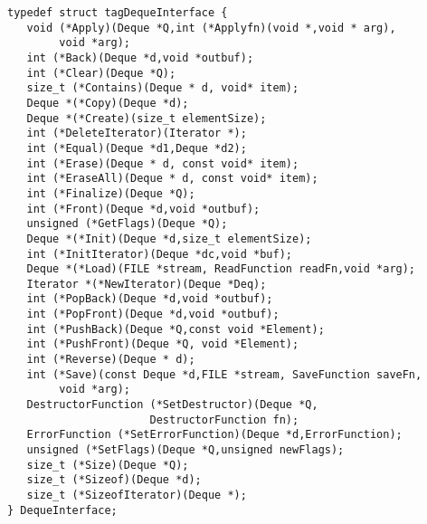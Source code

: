 \begin{verbatim}
typedef struct tagDequeInterface {
   void (*Apply)(Deque *Q,int (*Applyfn)(void *,void * arg),
        void *arg);
   int (*Back)(Deque *d,void *outbuf);
   int (*Clear)(Deque *Q);
   size_t (*Contains)(Deque * d, void* item);
   Deque *(*Copy)(Deque *d);
   Deque *(*Create)(size_t elementSize);
   int (*DeleteIterator)(Iterator *);
   int (*Equal)(Deque *d1,Deque *d2);
   int (*Erase)(Deque * d, const void* item);
   int (*EraseAll)(Deque * d, const void* item);
   int (*Finalize)(Deque *Q);
   int (*Front)(Deque *d,void *outbuf);
   unsigned (*GetFlags)(Deque *Q);
   Deque *(*Init)(Deque *d,size_t elementSize);
   int (*InitIterator)(Deque *dc,void *buf);
   Deque *(*Load)(FILE *stream, ReadFunction readFn,void *arg);
   Iterator *(*NewIterator)(Deque *Deq);
   int (*PopBack)(Deque *d,void *outbuf);
   int (*PopFront)(Deque *d,void *outbuf);
   int (*PushBack)(Deque *Q,const void *Element);
   int (*PushFront)(Deque *Q, void *Element);
   int (*Reverse)(Deque * d);
   int (*Save)(const Deque *d,FILE *stream, SaveFunction saveFn,
        void *arg);
   DestructorFunction (*SetDestructor)(Deque *Q,
                      DestructorFunction fn);
   ErrorFunction (*SetErrorFunction)(Deque *d,ErrorFunction);
   unsigned (*SetFlags)(Deque *Q,unsigned newFlags);
   size_t (*Size)(Deque *Q);
   size_t (*Sizeof)(Deque *d);
   size_t (*SizeofIterator)(Deque *);
} DequeInterface;
\end{verbatim}

